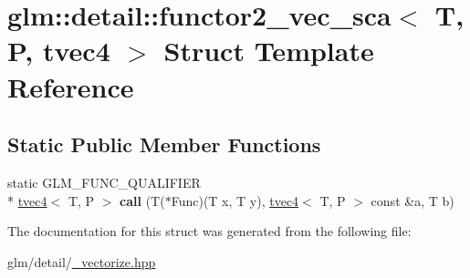 \hypertarget{structglm_1_1detail_1_1functor2__vec__sca_3_01T_00_01P_00_01tvec4_01_4}{\section{glm\-:\-:detail\-:\-:functor2\-\_\-vec\-\_\-sca$<$ T, P, tvec4 $>$ Struct Template Reference}
\label{structglm_1_1detail_1_1functor2__vec__sca_3_01T_00_01P_00_01tvec4_01_4}
}
\subsection*{Static Public Member Functions}
\begin{DoxyCompactItemize}
\item 
\hypertarget{structglm_1_1detail_1_1functor2__vec__sca_3_01T_00_01P_00_01tvec4_01_4_ac8dcfe692f5b5d07ca805f981d58a913}{static G\-L\-M\-\_\-\-F\-U\-N\-C\-\_\-\-Q\-U\-A\-L\-I\-F\-I\-E\-R \\*
\hyperlink{structglm_1_1tvec4}{tvec4}$<$ T, P $>$ {\bfseries call} (T($\ast$Func)(T x, T y), \hyperlink{structglm_1_1tvec4}{tvec4}$<$ T, P $>$ const \&a, T b)}\label{structglm_1_1detail_1_1functor2__vec__sca_3_01T_00_01P_00_01tvec4_01_4_ac8dcfe692f5b5d07ca805f981d58a913}

\end{DoxyCompactItemize}


The documentation for this struct was generated from the following file\-:\begin{DoxyCompactItemize}
\item 
glm/detail/\hyperlink{__vectorize_8hpp}{\-\_\-vectorize.\-hpp}\end{DoxyCompactItemize}
